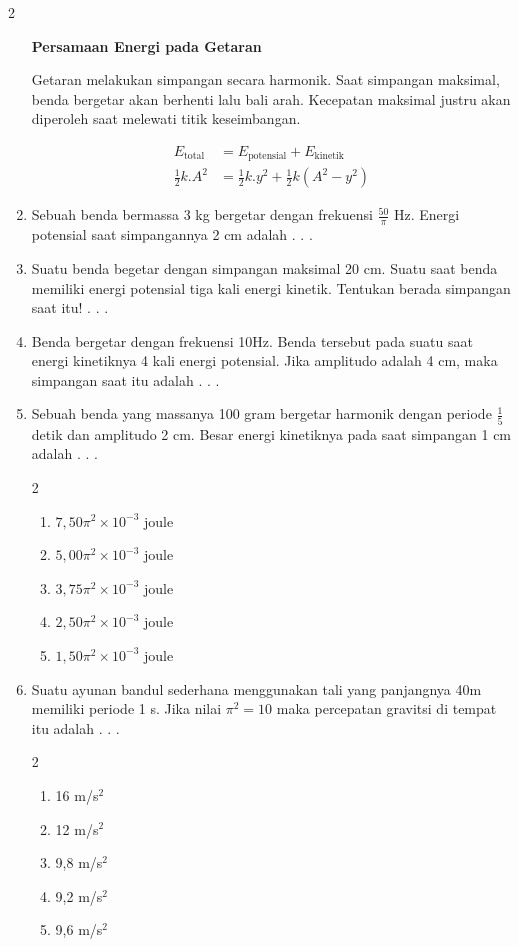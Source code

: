 \documentclass[10pt,a4paper]{extarticle}
\newcommand{\pilgani}[1]{                            \vspace{-0.3cm}\begin{multicols}{2}
 \begin{enumerate}[label=\Alph*., itemsep=0pt,topsep=0pt,leftmargin=*,align=Center]#1                     \end{enumerate}
 \phantom{ini cuma sapi, wedus, dan ayam}
 \end{multicols}}
\begin{document}
\begin{multicols*}{2}
\begin{enumerate}
\vspace{7cm}


\textbf{Persamaan Energi pada Getaran}




Getaran melakukan simpangan secara harmonik. Saat simpangan maksimal, benda bergetar akan berhenti lalu bali arah. Kecepatan maksimal justru akan diperoleh saat melewati titik keseimbangan.

\begin{align*}
E_{\text{total}}&=E_{\text{potensial}}+ E_{\text{kinetik}}\\
\frac{1}{2}k.A^2 &= \frac{1}{2}k.y^2+\frac{1}{2}k(A^2-y^2)
\end{align*}


\item Sebuah benda bermassa 3 kg bergetar dengan frekuensi $\frac{50}{\pi}$ Hz. Energi potensial saat simpangannya 2 cm adalah . . .  

\vspace{3cm}

\item Suatu benda begetar dengan simpangan maksimal 20 cm. Suatu saat benda memiliki energi potensial tiga kali energi kinetik. Tentukan berada simpangan saat itu! . . . 
\vspace{4cm}

\item Benda bergetar dengan frekuensi 10Hz. Benda tersebut pada suatu saat energi kinetiknya 4 kali energi potensial. Jika amplitudo adalah 4 cm, maka simpangan saat itu adalah . . . 
\vspace{4cm}

\item Sebuah benda yang massanya 100 gram bergetar harmonik dengan periode $\frac{1}{5}$ detik dan amplitudo 2 cm. Besar energi kinetiknya pada saat simpangan 1 cm adalah . . .
\pilgani{
   \item $7,50 \pi^2 \times 10^{-3}$ joule
   \item $5,00 \pi^2 \times 10^{-3}$ joule
   \item $3,75 \pi^2 \times 10^{-3}$ joule
   \item $2,50\pi^2 \times 10^{-3}$ joule
   \item $1,50 \pi^2 \times 10^{-3}$ joule
}
\vspace{3cm}
\item Suatu ayunan bandul sederhana menggunakan tali yang panjangnya 40m memiliki periode 1 s. Jika nilai $\pi^2=10$ maka percepatan gravitsi di tempat itu adalah . . .
\pilgani{
   \item 16 m/s$^2$
   \item 12 m/s$^2$
   \item 9,8 m/s$^2$
   \item 9,2 m/s$^2$
   \item 9,6 m/s$^2$}
\vspace{3cm}


\end{enumerate}
\end{multicols*}
\end{document}
